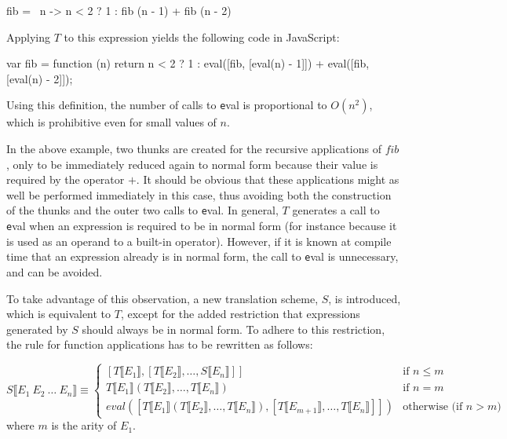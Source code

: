 \begin{CleanCode}
fib = \ n -> n < 2 ? 1 : fib (n - 1) + fib (n - 2)
\end{CleanCode}

Applying $T$ to this expression yields the following code in JavaScript:

\begin{CleanCode}
var fib = function (n) {
    return n < 2 ? 1 : eval([fib, [eval(n) - 1]]) + eval([fib, [eval(n) - 2]]);
}
\end{CleanCode}

Using this definition, the number of calls to {\texttt eval} is proportional to
$O(n^2)$, which is prohibitive even for small values of $n$.


In the above example, two thunks are created for the recursive applications of
$fib$, only to be immediately reduced again to normal form because their value
is required by the operator $+$. It should be obvious that these applications
might as well be performed immediately in this case, thus avoiding both the
construction of the thunks and the outer two calls to {\texttt eval}. In
general, $T$ generates a call to {\texttt eval} when an expression is required
to be in normal form (for instance because it is used as an operand to a
built-in operator). However, if it is known at compile time that an expression
already is in normal form, the call to {\texttt eval} is unnecessary, and can
be avoided.

To take advantage of this observation, a new translation scheme, $S$, is
introduced, which is equivalent to $T$, except for the added restriction that
expressions generated by $S$ should always be in normal form. To adhere to this
restriction, the rule for function applications has to be rewritten as follows:

\begin{equation*}
S \llbracket E_1 \: E_2 \: \ldots \: E_n \rrbracket \equiv
\begin{cases}
[T \llbracket E_1 \rrbracket, [T \llbracket E_2 \rrbracket,
                               \ldots,
                               S \llbracket E_n \rrbracket]] &
        \text{if $n \le m$} \\
T \llbracket E_1 \rrbracket(T \llbracket E_2 \rrbracket,
                            \ldots,
                            T \llbracket E_n \rrbracket) &
        \text{if $n = m$} \\
eval([ T \llbracket E_1 \rrbracket(T \llbracket E_2 \rrbracket,
                                   \ldots,
                                   T \llbracket E_n \rrbracket),
                        [T \llbracket E_{m+1} \rrbracket,
                         \ldots,
                         T \llbracket E_n \rrbracket]]) &
        \text{otherwise (if $n > m$)}
\end{cases}
\end{equation*}
where $m$ is the arity of $E_1$.

